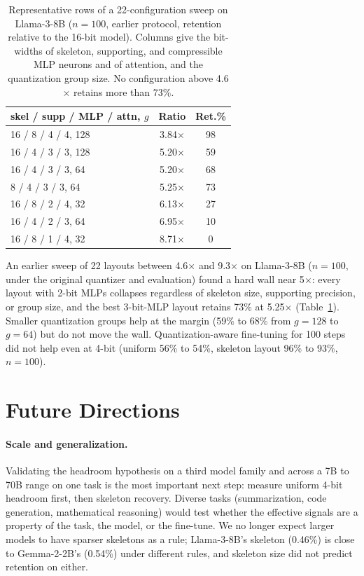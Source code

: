 \documentclass[11pt]{article}
\begin{document}
\begin{table}[t]
\centering
\small
\setlength{\tabcolsep}{4pt}
\begin{tabular}{lcc}
\toprule
\textbf{skel / supp / MLP / attn, $g$} & \textbf{Ratio} & \textbf{Ret.\%} \\
\midrule
16 / 8 / 4 / 4, 128 & 3.84$\times$ & 98 \\
16 / 4 / 3 / 3, 128 & 5.20$\times$ & 59 \\
16 / 4 / 3 / 3, 64 & 5.20$\times$ & 68 \\
8 / 4 / 3 / 3, 64 & 5.25$\times$ & 73 \\
16 / 8 / 2 / 4, 32 & 6.13$\times$ & 27 \\
16 / 4 / 2 / 3, 64 & 6.95$\times$ & 10 \\
16 / 8 / 1 / 4, 32 & 8.71$\times$ & 0 \\
\bottomrule
\end{tabular}
\caption{Representative rows of a 22-configuration sweep on 
Llama-3-8B ($n{=}100$, earlier protocol, retention relative to 
the 16-bit model). Columns give the bit-widths of skeleton, 
supporting, and compressible MLP neurons and of attention, and 
the quantization group size. No configuration above 4.6$\times$ 
retains more than 73\%.}
\label{tab:wall}
\end{table}

An earlier sweep of 22 layouts between 4.6$\times$ and 
9.3$\times$ on Llama-3-8B ($n{=}100$, under the original 
quantizer and evaluation) found a hard wall near 5$\times$: 
every layout with 2-bit MLPs collapses regardless of skeleton 
size, supporting precision, or group size, and the best 
3-bit-MLP layout retains 73\% at 5.25$\times$ 
(Table~\ref{tab:wall}). Smaller quantization groups help at the 
margin (59\% to 68\% from $g{=}128$ to $g{=}64$) but do not 
move the wall. Quantization-aware fine-tuning for 100 steps did not help even at 4-bit (uniform 56\% to 54\%, skeleton layout 96\% to 93\%, 
$n{=}100$).


\section{Future Directions}
\label{app:future}

\paragraph{Scale and generalization.}
Validating the headroom hypothesis on a third model family and 
across a 7B to 70B range on one task is the most important next 
step: measure uniform 4-bit headroom first, then skeleton 
recovery. Diverse tasks (summarization, code generation, 
mathematical reasoning) would test whether the effective 
signals are a property of the task, the model, or the 
fine-tune. We no longer expect larger models to have sparser 
skeletons as a rule; Llama-3-8B's skeleton (0.46\%) is close to 
Gemma-2-2B's (0.54\%) under different rules, and skeleton size 
did not predict retention on either.
\end{document}
